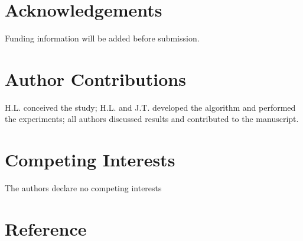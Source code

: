 \documentclass[pdflatex,sn-mathphys-num]{sn-jnl}
\theoremstyle{thmstyleone}%
\begin{document}
\section*{Acknowledgements}
Funding information will be added before submission.

\section*{Author Contributions}
H.L. conceived the study; H.L. and J.T. developed the algorithm and performed the experiments; all authors discussed results and contributed to the manuscript.

\section*{Competing Interests}
The authors declare no competing interests

\newpage
\clearpage
\section*{Reference}


\end{document}
